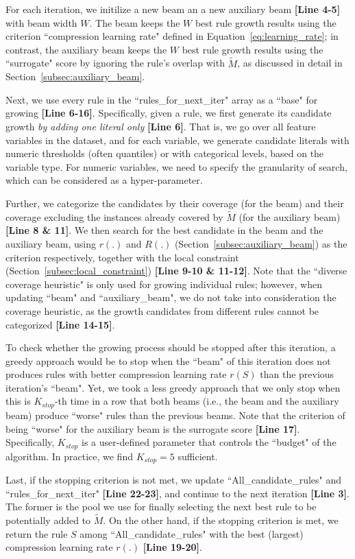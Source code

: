 For each iteration, we initilize a new beam an a new auxiliary beam \textbf{[Line 4-5]} with beam width $W$. The beam keeps the $W$ best rule growth results using the criterion ``compression learning rate" defined in Equation~\ref{eq:learning_rate}; in contrast, the auxiliary beam keeps the $W$ best rule growth results using the ``surrogate" score by ignoring the rule's overlap with $\tilde{M}$, as discussed in detail in Section~\ref{subsec:auxiliary_beam}. 

Next, we use every rule in the ``rules\_for\_next\_iter" array as a ``base" for growing \textbf{[Line 6-16]}. Specifically, given a rule, we first generate its candidate growth \emph{by adding one  literal only} \textbf{[Line 6]}. That is, we go over all feature variables in the dataset, and for each variable, we generate candidate literals with numeric thresholds (often quantiles) or with categorical levels, based on the variable type. For numeric variables, we need to specify the granularity of search, which can be considered as a hyper-parameter. 

Further, we categorize the candidates by their coverage (for the beam) and their coverage excluding the instances already covered by $\tilde{M}$ (for the auxiliary beam) \textbf{[Line 8 \& 11]}. We then search for the best candidate in the beam and the auxiliary beam, using $r(.)$ and $R(.)$ (Section~\ref{subsec:auxiliary_beam}) as the criterion respectively, together with the local constraint (Section~\ref{subsec:local_constraint}) \textbf{[Line 9-10 \& 11-12]}. Note that the ``diverse coverage heuristic" is only used for growing individual rules; however, when updating ``beam" and ``auxiliary\_beam", we do not take into consideration the coverage heuristic, as the growth candidates from different rules cannot be categorized \textbf{[Line 14-15]}. 

To check whether the growing process should be stopped after this iteration, a greedy approach would be to stop when the ``beam" of this iteration does not produces rules with better compression learning rate $r(S)$ than the previous iteration's ``beam". Yet, we took a less greedy approach that we only stop when this is $K_{stop}$-th time in a row that both beams (i.e., the beam and the auxiliary beam) produce ``worse" rules than the previous beams. Note that the criterion of being ``worse" for the auxiliary beam is the surrogate score \textbf{[Line 17]}. Specifically, $K_{stop}$ is a user-defined parameter that controls the ``budget" of the algorithm. In practice, we find $K_{stop} = 5$ sufficient. 

Last, if the stopping criterion is not met, we update ``All\_candidate\_rules" and \\
``rules\_for\_next\_iter" \textbf{[Line 22-23]}, and continue to the next iteration \textbf{[Line 3]}. The former is the pool we use for finally selecting the next best rule to be potentially added to $\tilde{M}$. On the other hand, if the stopping criterion is met, we return the rule $S$ among ``All\_candidate\_rules" with the best (largest) compression learning rate $r(.)$ \textbf{[Line 19-20]}. 






